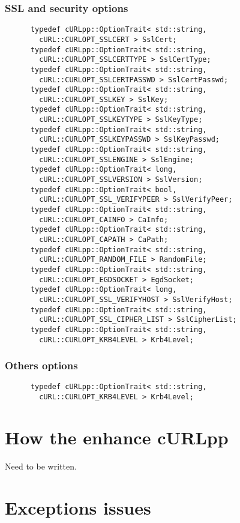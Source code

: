 \documentclass{article}
\begin{document}
\subsubsection{SSL and security options}
\begin{verbatim}       
      typedef cURLpp::OptionTrait< std::string, 
        cURL::CURLOPT_SSLCERT > SslCert;
      typedef cURLpp::OptionTrait< std::string, 
        cURL::CURLOPT_SSLCERTTYPE > SslCertType;
      typedef cURLpp::OptionTrait< std::string, 
        cURL::CURLOPT_SSLCERTPASSWD > SslCertPasswd;
      typedef cURLpp::OptionTrait< std::string, 
        cURL::CURLOPT_SSLKEY > SslKey;
      typedef cURLpp::OptionTrait< std::string, 
        cURL::CURLOPT_SSLKEYTYPE > SslKeyType;
      typedef cURLpp::OptionTrait< std::string, 
        cURL::CURLOPT_SSLKEYPASSWD > SslKeyPasswd;
      typedef cURLpp::OptionTrait< std::string, 
        cURL::CURLOPT_SSLENGINE > SslEngine;
      typedef cURLpp::OptionTrait< long, 
        cURL::CURLOPT_SSLVERSION > SslVersion;
      typedef cURLpp::OptionTrait< bool, 
        cURL::CURLOPT_SSL_VERIFYPEER > SslVerifyPeer;
      typedef cURLpp::OptionTrait< std::string, 
        cURL::CURLOPT_CAINFO > CaInfo;
      typedef cURLpp::OptionTrait< std::string, 
        cURL::CURLOPT_CAPATH > CaPath;
      typedef cURLpp::OptionTrait< std::string, 
        cURL::CURLOPT_RANDOM_FILE > RandomFile;
      typedef cURLpp::OptionTrait< std::string, 
        cURL::CURLOPT_EGDSOCKET > EgdSocket;
      typedef cURLpp::OptionTrait< long, 
        cURL::CURLOPT_SSL_VERIFYHOST > SslVerifyHost;
      typedef cURLpp::OptionTrait< std::string, 
        cURL::CURLOPT_SSL_CIPHER_LIST > SslCipherList;
      typedef cURLpp::OptionTrait< std::string, 
        cURL::CURLOPT_KRB4LEVEL > Krb4Level;
\end{verbatim}

\subsubsection{Others options}
\begin{verbatim}
      typedef cURLpp::OptionTrait< std::string, 
        cURL::CURLOPT_KRB4LEVEL > Krb4Level;
\end{verbatim}


\section{How the enhance cURLpp}
Need to be written.

\section{Exceptions issues}
\end{document}
